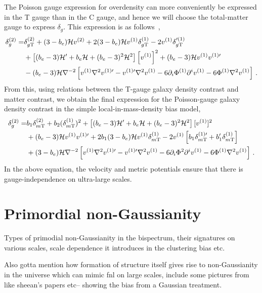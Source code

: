 The Poisson gauge expression for overdensity can more conveniently be expressed in the T gauge than in the C gauge, and hence we will choose the total-matter gauge to express $\delta_g$. This expression is as follows~\cite{Jolicoeur:2017nyt},
\begin{align}
	\delta_g^{(2)} =& \delta_{g\mathrm{T}}^{(2)} + (3 - b_e)\mathcal{H} v^{(2)} + 2 (3 - b_e) \mathcal{H} v^{(1)} \delta_{g\mathrm{T}}^{(1)} - 2 v^{(1)} \delta_{g\mathrm{T}}'^{(1)} \nonumber \\
	&+ \left[ (b_e - 3)\mathcal{H}' + b_e \mathcal{H} + (b_e -3)^2 \mathcal{H}^2  \right] \left[ v^{(1)} \right]^2 + (b_e - 3) \mathcal{H} v^{(1)} v^{{(1)}\prime} \nonumber \\
	& - (b_e - 3) \mathcal{H} \nabla^{-2} \left[ v^{(1)} \nabla^2 v^{{(1)}\prime} - v^{{(1)}\prime} \nabla^2 v^{(1)} - 6 \partial_i \Phi^{(1)} \partial^i v^{(1)} - 6 \Phi^{(1)} \nabla^2 v^{(1)} \right] \,.
\end{align}
From this, using relations between the T-gauge galaxy density contrast and matter contrast, we obtain the final expression for the Poisson-gauge galaxy density contrast in the simple local-in-mass-density bias model, 
\begin{align}
	\delta_g^{(2)} =& b_1 \delta_{m\mathrm{T}}^{(2)} + b_2 (\delta_{m\mathrm{T}}^{(1)} )^2 + \left[ (b_e - 3)\mathcal{H}' + b_e \mathcal{H} + (b_e -3)^2 \mathcal{H}^2 \right] [v^{(1)}]^2 \nonumber \\
	&+ (b_e - 3) \mathcal{H} v^{(1)} v^{{(1)} \prime} + 2 b_1 (3 - b_e) \mathcal{H} v^{(1)} \delta_{m\mathrm{T}}^{(1)} - 2 v^{(1)} \left[ b_1 \delta_{m\mathrm{T}}^{{(1)} \prime} + b_1' \delta_{m\mathrm{T}}^{(1)} \right] \nonumber \\
	& + (3 - b_e) \mathcal{H} \nabla^{-2} \left[ v^{(1)} \nabla^2 v^{{(1)} \prime} - v^{{(1)} \prime} \nabla^2 v^{(1)} - 6 \partial_i \Phi^2 \partial^i v^{(1)} - 6 \Phi^{(1)} \nabla^2 v^{(1)} \right]\,.
\end{align}
In the above equation, the velocity and metric potentials ensure that there is gauge-independence on ultra-large scales. 
\fi
\fi
\section{Primordial non-Gaussianity}

Types of primodial non-Gaussianity in the bispectrum, their signatures on various scales, scale dependence it introduces in the clustering bias etc. 

Also gotta mention how formation of structure itself gives rise to non-Gaussianity in the universe which can mimic fnl on large scales, include some pictures from like sheean's papers etc-- showing the bias from a Gaussian treatment.

